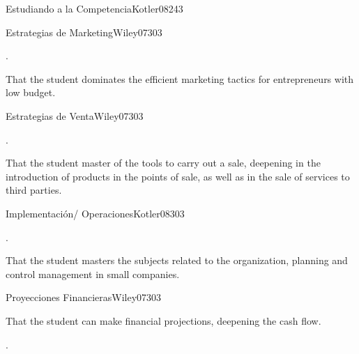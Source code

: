 \begin{syllabus}
\begin{unit}{}{Estudiando a la Competencia}{Kotler08}{24}{3}
\end{unit}

\begin{unit}{}{Estrategias de Marketing}{Wiley07}{30}{3}
   \begin{topics}
      \item . 
   \end{topics}

   \begin{learningoutcomes}
      \item That the student dominates the efficient marketing tactics for entrepreneurs with low budget.
   \end{learningoutcomes}
\end{unit}

\begin{unit}{}{Estrategias de Venta}{Wiley07}{30}{3}
   \begin{topics}
      \item .
   \end{topics}

   \begin{learningoutcomes}
      \item That the student master of the tools to carry out a sale, deepening in the introduction of products in the points of sale, as well as in the sale of services to third parties.
   \end{learningoutcomes}
\end{unit}

\begin{unit}{}{Implementación/ Operaciones}{Kotler08}{30}{3}
   \begin{topics}
      \item . 
   \end{topics}


   \begin{learningoutcomes}
      \item That the student masters the subjects related to the organization, planning and control management in small companies.
   \end{learningoutcomes}

\end{unit}

\begin{unit}{}{Proyecciones Financieras}{Wiley07}{30}{3}
   \begin{topics}
      \item That the student can make financial projections, deepening the cash flow.
   \end{topics}

   \begin{learningoutcomes}
      \item .
   \end{learningoutcomes}
\end{unit}



\begin{coursebibliography}
\end{coursebibliography}

\end{syllabus}
